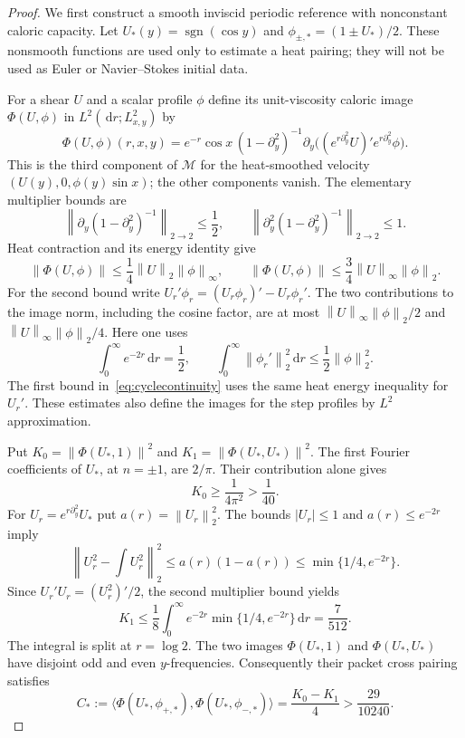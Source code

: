 \documentclass[11pt]{article}
\newcommand{\dd}{\,\mathrm d}
\newcommand{\norm}[1]{\left\lVert#1\right\rVert}
\begin{document}
\begin{proof}
We first construct a smooth inviscid periodic reference with nonconstant
caloric capacity. Let $U_*(y)=\operatorname{sgn}(\cos y)$ and
$\phi_{\pm,*}=(1\pm U_*)/2$. These nonsmooth functions are used only
to estimate a heat pairing; they will not be used as Euler or
Navier--Stokes initial data.

For a shear $U$ and a scalar profile $\phi$ define its unit-viscosity
caloric image $\Phi(U,\phi)$ in $L^2(\dd r;L^2_{x,y})$ by
\[
 \Phi(U,\phi)(r,x,y)
   =e^{-r}\cos x\,(1-\partial_y^2)^{-1}
           \partial_y\bigl((e^{r\partial_y^2}U)'
                                  e^{r\partial_y^2}\phi\bigr).
\]
This is the third component of $\mathcal M$ for the heat-smoothed
velocity $(U(y),0,\phi(y)\sin x)$; the other components vanish.
The elementary multiplier bounds are
\[
 \norm{\partial_y(1-\partial_y^2)^{-1}}_{2\to2}\leq\frac12,
 \qquad
 \norm{\partial_y^2(1-\partial_y^2)^{-1}}_{2\to2}\leq1.
\]
Heat contraction and its energy identity give
\begin{equation}\label{eq:cyclecontinuity}
 \norm{\Phi(U,\phi)}\leq\frac14\norm U_2\norm\phi_\infty,
 \qquad
 \norm{\Phi(U,\phi)}\leq\frac34\norm U_\infty\norm\phi_2.
\end{equation}
For the second bound write $U_r'\phi_r=(U_r\phi_r)'-U_r\phi_r'$.
The two contributions to the image norm, including the cosine factor,
are at most $\norm U_\infty\norm\phi_2/2$ and
$\norm U_\infty\norm\phi_2/4$. Here one uses
\[
 \int_0^\infty e^{-2r}\dd r=\frac12,
 \qquad
 \int_0^\infty\norm{\phi_r'}_2^2\dd r\leq\frac12\norm\phi_2^2.
\]
The first bound in~\eqref{eq:cyclecontinuity} uses the same heat
energy inequality for $U_r'$. These estimates also define the images
for the step profiles by $L^2$ approximation.

Put $K_0=\norm{\Phi(U_*,1)}^2$ and
$K_1=\norm{\Phi(U_*,U_*)}^2$. The first Fourier coefficients of
$U_*$, at $n=\pm1$, are $2/\pi$. Their contribution alone gives
\[
 K_0\geq\frac1{4\pi^2}>\frac1{40}.
\]
For $U_r=e^{r\partial_y^2}U_*$ put $a(r)=\norm{U_r}_2^2$.
The bounds $|U_r|\leq1$ and $a(r)\leq e^{-2r}$ imply
\[
 \norm{U_r^2-\textstyle\int U_r^2}_2^2
       \leq a(r)(1-a(r))\leq\min\{1/4,e^{-2r}\}.
\]
Since $U_r'U_r=(U_r^2)'/2$, the second multiplier bound yields
\[
 K_1\leq\frac18\int_0^\infty e^{-2r}
                \min\{1/4,e^{-2r}\}\dd r=\frac7{512}.
\]
The integral is split at $r=\log2$. The two images
$\Phi(U_*,1)$ and $\Phi(U_*,U_*)$ have disjoint odd and even
$y$-frequencies. Consequently their packet cross pairing satisfies
\[
 C_*:=\langle\Phi(U_*,\phi_{+,*}),\Phi(U_*,\phi_{-,*})\rangle
       =\frac{K_0-K_1}{4}>\frac{29}{10240}.
\]


\end{proof}
\end{document}
